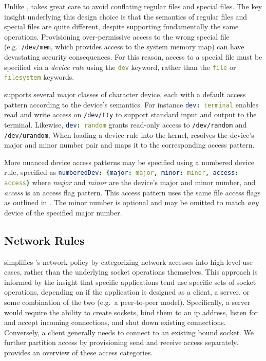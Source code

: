 Unlike \bpfbox{}, \bpfcontain{} takes great care to avoid conflating regular files and
special files. The key insight underlying this design choice is that the semantics of
regular files and special files are quite different, despite supporting fundamentally the
same operations. Provisioning over-permissive access to the wrong special file
(e.g.\ \texttt{/dev/mem}, which provides access to the system memory map) can have
devastating security consequences. For this reason, access to a special file must be
specified via a \textit{device rule} using the \lstinline[language=yaml]|dev| keyword,
rather than the \lstinline[language=yaml]|file| or \lstinline[language=yaml]|filesystem|
keywords.

\bpfcontain{} supports several major classes of character device, each with a default
access pattern according to the device's semantics.  For instance
\lstinline[language=yaml]|dev: terminal| enables read and write access on
\texttt{/dev/tty} to support standard input and output to the terminal. Likewise,
\lstinline[language=yaml]|dev: random| grants read-only access to \texttt{/dev/random} and
\texttt{/dev/urandom}. When loading a device rule into the kernel, \bpfcontain{} resolves
the device's major and minor number pair and maps it to the corresponding access pattern.

More nuanced device access patterns may be specified using a numbered device rule,
specified as \lstinline[language=yaml]|numberedDev: {major: major, minor: minor, access: access}|
where \textit{major} and \textit{minor} are the device's major and minor number, and
\textit{access} is an access flag pattern. This access pattern uses the same file access
flags as outlined in . The minor number is optional and
may be omitted to match \textit{any} device of the specified major number.

\subsection{Network Rules}

\bpfcontain{} simplifies \bpfbox{}'s network policy by categorizing network accesses into
high-level use cases, rather than the underlying socket operations themselves. This
approach is informed by the insight that specific applications tend use specific sets of
socket operations, depending on if the application is designed as a client, a server, or
some combination of the two (e.g.\ a peer-to-peer model). Specifically, a server would
require the ability to create sockets, bind them to an \gls{ip} address, listen for and
accept incoming connections, and shut down existing connections. Conversely, a client
generally needs to connect to an existing bound socket. We further partition access by
provisioning send and receive access separately.  provides an
overview of these access categories.

